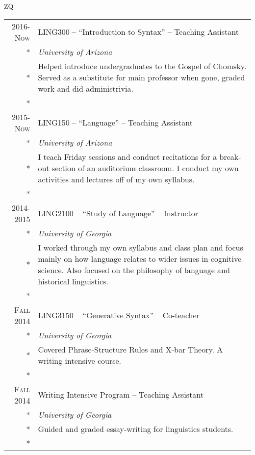ZQ\documentclass[letterpaper,10pt]{article}
\newcommand{\entex}[4]{{\textsc{#1}}&#2\\*&\textit{#3}\\*&\footnotesize{#4}\\*\multicolumn{2}{c}{}\\}
\newcommand{\uga}{University of Georgia}
\newcommand{\ua}{University of Arizona}
\begin{document}
\begin{longtable}{r|p{12cm}}




\entex{2016-Now}{LING300 -- ``Introduction to Syntax'' -- Teaching Assistant}{\ua}{Helped introduce undergraduates to the Gospel of Chomsky. Served as a substitute for main professor when gone, graded work and did administrivia.}

\entex{2015-Now}{LING150 -- ``Language'' -- Teaching Assistant}{\ua}{I teach Friday sessions and conduct recitations for a break-out section of an auditorium classroom. I conduct my own activities and lectures off of my own syllabus.}


\entex{2014-2015}{LING2100 -- ``Study of Language'' -- Instructor}{\uga}{I worked through my own syllabus and class plan and focus mainly on how language relates to wider issues in cognitive science. Also focused on the philosophy of language and historical linguistics.}

\entex{Fall 2014}{LING3150 -- ``Generative Syntax'' -- Co-teacher}{\uga}{Covered Phrase-Structure Rules and X-bar Theory. A writing intensive course.}

\entex{Fall 2014}{Writing Intensive Program -- Teaching Assistant}{\uga}{Guided and graded essay-writing for linguistics students.}
\end{longtable}
\end{document}
